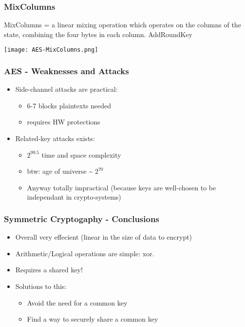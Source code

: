 \documentclass[
hyperref={pdfpagelabels=false}
,xcolor=table
]
{beamer}
\newcommand{\plus}{{\texttt{[image: plus.png]}}}
\newcommand{\minus}{{\texttt{[image: minus.png]}}}
\begin{document}
\begin{frame}
  \frametitle{MixColumns}
  MixColumns = a
      linear mixing operation which operates on the columns of the
      state, combining the four bytes in each column.
      AddRoundKey


  \begin{center}
    \texttt{[image: AES-MixColumns.png]}
  \end{center}
 
\end{frame}

\begin{frame}
  \frametitle{AES - Weaknesses and Attacks}

  \begin{itemize}
  \item Side-channel attacks are practical:
    \begin{itemize}
    \item 6-7 blocks plaintexts needed
    \item[$\Rightarrow$] requires HW protections
    \end{itemize}
  \item Related-key attacks exists:
    \begin{itemize}
    \item $2^{99.5}$ time and space complexity
    \item btw: age of universe \~{} $2^{70}$
    \item Anyway totally impractical (because keys are well-chosen to
      be independant in crypto-systems)
    \end{itemize}
  \end{itemize}
  \end{frame}



\begin{frame}
  \frametitle{Symmetric Cryptogaphy - Conclusions}

  \begin{itemize}
  \item[\plus] Overall very effecient (linear in the size of data to encrypt)
  \item[\plus] Arithmetic/Logical operations are simple: xor. 
  \item[\minus] Requires a shared key! 
  \item Solutions to this:
    \begin{itemize}
    \item Avoid the need for a common key
    \item Find a way to securely share a common key
    \end{itemize}
  \end{itemize}
\end{frame}
\end{document}

